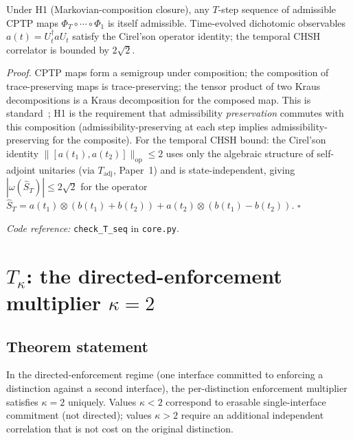 \documentclass[11pt]{article}
\theoremstyle{remark}
\newcommand{\coderef}[2]{\smallskip\noindent\textit{Code reference:} \texttt{#1} in \texttt{#2}.}
\begin{document}
\begin{tcolorbox}[apfbox, title={Theorem 2.2 ($T_{\mathrm{seq}}$)}]
Under H1 (Markovian-composition closure), any $T$-step sequence of admissible
CPTP maps $\Phi_T \circ \cdots \circ \Phi_1$ is itself admissible.
Time-evolved dichotomic observables $a(t) = U_t^\dagger a U_t$ satisfy the
Cirel'son operator identity; the temporal CHSH correlator is bounded by
$2\sqrt{2}$.
\end{tcolorbox}

\textit{Proof.}  CPTP maps form a semigroup under composition; the
composition of trace-preserving maps is trace-preserving; the tensor
product of two Kraus decompositions is a Kraus decomposition for the
composed map.  This is standard~\cite{Lindblad1976,GKS1976}; H1 is the
requirement that admissibility \emph{preservation} commutes with this
composition (admissibility-preserving at each step implies
admissibility-preserving for the composite).  For the temporal CHSH bound:
the Cirel'son identity $\|[a(t_1), a(t_2)]\|_{\mathrm{op}} \leq 2$ uses
only the algebraic structure of self-adjoint unitaries
(via $T_{\mathrm{adj}}$, Paper~1) and is state-independent, giving
$|\omega(\hat{S}_T)| \leq 2\sqrt{2}$ for the operator
$\hat{S}_T = a(t_1)\otimes(b(t_1)+b(t_2)) + a(t_2)\otimes(b(t_1)-b(t_2))$.
\hfill$\square$

\coderef{check\_T\_seq}{core.py}


\section{$T_\kappa$: the directed-enforcement multiplier $\kappa = 2$}
\label{sec:Tkappa}

\subsection{Theorem statement}

\begin{tcolorbox}[apfbox, title={Theorem 3.1 ($T_\kappa$)}]
In the directed-enforcement regime (one interface committed to enforcing a
distinction against a second interface), the per-distinction enforcement
multiplier satisfies $\kappa = 2$ uniquely.  Values $\kappa < 2$ correspond
to erasable single-interface commitment (not directed); values $\kappa > 2$
require an additional independent correlation that is not cost on the
original distinction.
\end{tcolorbox}
\end{document}
